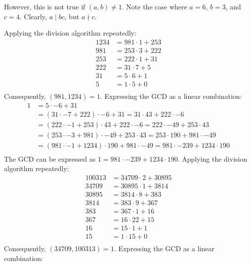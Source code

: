 \documentclass{article}
\begin{document}
However, this is not true if $(a, b) \neq 1$. Note the case where $a = 6$, $b = 3$, and $c = 4$. Clearly, $a \mid bc$, but $a \nmid c$.

\clearpage

\problem{}
Applying the division algorithm repeatedly:
\begin{align*}
    1234 & = 981 \cdot 1 + 253 \\
    981 & = 253 \cdot 3 + 222 \\
    253 & = 222 \cdot 1 + 31 \\
    222 & = 31 \cdot 7 + 5 \\
    31 & = 5 \cdot 6 + 1 \\
    5 & = 1 \cdot 5 + 0 \\
\end{align*}
Consequently, $(981, 1234) = 1$. Expressing the GCD as a linear combination:
\begin{align*}
    1 & = 5 \cdot -6 + 31 \\
    & = (31 \cdot -7 + 222) \cdot -6 + 31 = 31 \cdot 43 + 222 \cdot -6 \\
    & = (222 \cdot -1 + 253) \cdot 43 + 222 \cdot -6 = 222 \cdot -49 + 253 \cdot 43 \\
    & = (253 \cdot -3 + 981) \cdot -49 + 253 \cdot 43 = 253 \cdot 190 + 981 \cdot -49 \\
    & = (981 \cdot -1 + 1234) \cdot 190 + 981 \cdot -49 = 981 \cdot -239 + 1234 \cdot 190 \\
\end{align*}
The GCD can be expressed as $1 = 981 \cdot -239 + 1234 \cdot 190$.
Applying the division algorithm repeatedly:
\begin{align*}
    100313 & = 34709 \cdot 2 + 30895 \\
    34709 & = 30895 \cdot 1 + 3814 \\
    30895 & = 3814 \cdot 8 + 383 \\
    3814 & = 383 \cdot 9 + 367 \\
    383 & = 367 \cdot 1 + 16 \\
    367 & = 16 \cdot 22 + 15 \\
    16 & = 15 \cdot 1 + 1 \\
    15 & = 1 \cdot 15 + 0 \\
\end{align*}
Consequently, $(34709, 100313) = 1$. Expressing the GCD as a linear combination:
\end{document}
